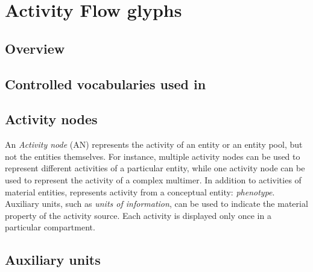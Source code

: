 \chapter{Activity Flow glyphs}
\label{chp:af:glyphs}

\section{Overview}



\section{Controlled vocabularies used in \SBGNAFLone}\label{af:sec:CVs}




\section{Activity nodes}\label{sec:af:ANs}

An \emph{Activity node} (AN) represents the activity of an entity or an entity pool, but not the entities themselves. For instance, multiple activity nodes can be used to represent different activities of a particular entity, while one activity node can be used to represent the activity of a complex multimer. In addition to activities of material entities, \SBGNAFLone represents activity from a conceptual entity: \emph{phenotype}.  Auxiliary units, such as \emph{units of information}, can be used to indicate the material property of the activity source.  Each activity is displayed only once in a particular compartment.



%



\section{Auxiliary units}\label{sec:af:AUs}

